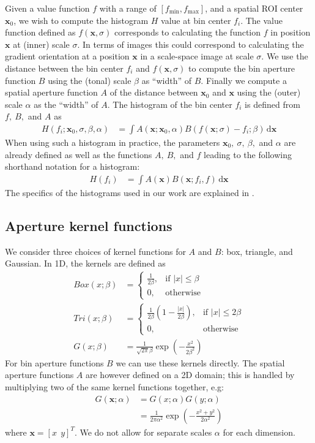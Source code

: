 \documentclass[thesis.tex]{subfiles}
\def\x{\mathbf{x}}
\begin{document}
Given a value function $f$ with a range of $[f_\text{min},f_\text{max}]$, and a spatial ROI center $\x_0$, we wish to compute the histogram $H$ value at bin center $f_i$.
The value function defined as $f(\x,\sigma)$ corresponds to calculating the function $f$ in position $\x$ at (inner) scale $\sigma$. In terms of images this could correspond to calculating the gradient orientation at a position $\x$ in a scale-space image at scale $\sigma$.
We use the distance between the bin center $f_i$ and $f(\x,\sigma)$ to compute the bin aperture function $B$ using the (tonal) scale $\beta$ as ``width'' of $B$. Finally we compute a spatial aperture function $A$ of the distance between $\x_0$ and $\x$ using the (outer) scale $\alpha$ as the ``width'' of $A$. The histogram of the bin center $f_i$ is defined from $f,~B,$ and $A$ as
%
\begin{align}
	\label{eq:histogramLong}
	H(f_i;\x_0,\sigma,\beta,\alpha) &= \int A(\x;\x_0,\alpha) B(f(\x;\sigma)-f_i;\beta)\,\text{d}\x
\end{align}
%
When using such a histogram in practice, the parameters $\x_0,~\sigma,~\beta,$ and $\alpha$ are already defined as well as the functions $A,~B,$ and $f$ leading to the following shorthand notation for a histogram:
%
\begin{align}
	\label{eq:histogramShort}
	H(f_i) &= \int A(\x) B(\x;f_i,f)\,\text{d}\x
\end{align}
%
The specifics of the histograms used in our work are explained in .
%
\subsection{Aperture kernel functions}
\label{sec:apertureKernelFunctions}
%
We consider three choices of kernel functions for $A$ and $B$: box, triangle, and Gaussian. In 1D, the kernels are defined as
%
\begin{align*}
\mathit{Box} (x; \beta) &= 
\begin{cases}
    \frac{1}{2 \beta},& \text{if } |x| \leq \beta \\
    0,              & \text{otherwise}
\end{cases} \\
\mathit{Tri} (x; \beta) &= 
\begin{cases}
    \frac{1}{2 \beta} \left( 1 - \frac{| x |}{2 \beta} \right) ,& \text{if } |x| \leq 2 \beta \\
    0,              & \text{otherwise}
\end{cases} \\
G(x;\beta) &= \frac{1}{\sqrt{2\pi} \beta}
\exp\left( -\frac{x^2}{2 \beta^2} \right)
\end{align*}
%
For bin aperture functions $B$ we can use these kernels directly. The spatial aperture functions $A$ are however defined on a 2D domain; this is handled by multiplying two of the same kernel functions together, e.g:
%
\begin{align*}
G(\x;\alpha) &= G(x;\alpha) G(y;\alpha) \\
&= \frac{1}{2\pi \alpha^2}
\exp\left( -\frac{x^2 + y^2}{2 \alpha^2} \right)
\end{align*}
%
where $\x = [x ~~ y]^T$. We do not allow for separate scales $\alpha$ for each dimension.
%
\end{document}
